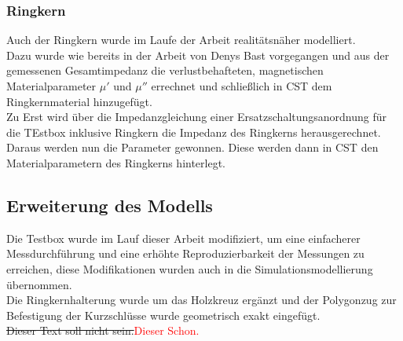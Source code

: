             \subsubsection{Ringkern}
            Auch der Ringkern wurde im Laufe der Arbeit realitätsnäher modelliert.\\
            Dazu wurde wie bereits in der Arbeit von Denys Bast vorgegangen und aus der gemessenen Gesamtimpedanz die verlustbehafteten, magnetischen Materialparameter $\mu'$ und $\mu''$ errechnet und schließlich in CST dem Ringkernmaterial hinzugefügt.\\
            Zu Erst wird über die Impedanzgleichung einer Ersatzschaltungsanordnung für die TEstbox inklusive Ringkern die Impedanz des Ringkerns herausgerechnet. Daraus werden nun die Parameter gewonnen. Diese werden dann in CST den Materialparametern des Ringkerns hinterlegt.
           
        \subsection{Erweiterung des Modells}
        Die Testbox wurde im Lauf dieser Arbeit modifiziert, um eine einfacherer Messdurchführung und eine erhöhte Reproduzierbarkeit der Messungen zu erreichen, diese Modifikationen wurden auch in die Simulationsmodellierung übernommen.\\
        Die Ringkernhalterung wurde um das Holzkreuz ergänzt und der Polygonzug zur Befestigung der Kurzschlüsse wurde geometrisch exakt eingefügt.\\
        
        \sout{Dieser Text soll nicht sein.}\textcolor{red}{Dieser Schon.}

